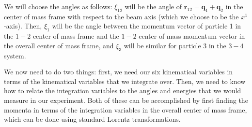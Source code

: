 \documentclass{article}
\numberwithin{equation}{subsection}
\begin{document}
We will choose the angles as follows: $\xi_{12}$ will be the angle of $\mathbf{r}_{12} = \mathbf{q}_1 + \mathbf{q}_2$ in the center
of mass frame with respect to the beam axis (which we choose to be the $x^1$-axis). Then, $\xi_1$ will be the angle between the momentum vector of
particle 1 in the $1-2$ center of mass frame and the $1-2$ center of mass momentum vector in the overall center of mass frame, and $\xi_3$ will be
similar for particle 3 in the $3-4$ system.

We now need to do two things: first, we need our six kinematical variables in terms of the kinematical variables that we integrate over. Then, we need
to know how to relate the integration variables to the angles and energies that we would measure in our experiment. Both of these can be accomplished
by first finding the momenta in terms of the integration variables in the overall center of mass frame, which can be done using standard Lorentz transformations.
\end{document}
